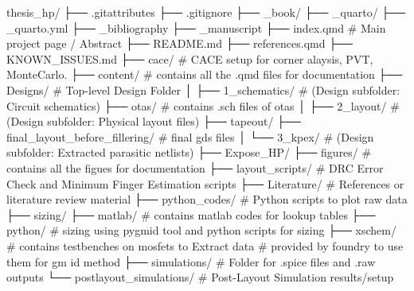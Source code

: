 \documentclass[
  11pt,
  a4paper,
  oneside]{scrbook}
\newenvironment{Shaded}{}{}
\newcommand{\NormalTok}[1]{#1}
\begin{document}
\begin{Shaded}
\begin{Highlighting}[]
\NormalTok{thesis\_hp/}
\NormalTok{├── .gitattributes}
\NormalTok{├── .gitignore}
\NormalTok{├── \_book/}
\NormalTok{├── \_quarto/}
\NormalTok{├── \_quarto.yml}
\NormalTok{├── \_bibliography}
\NormalTok{├── \_manuscript}
\NormalTok{├── index.qmd             \# Main project page / Abstract}
\NormalTok{├── README.md}
\NormalTok{├── references.qmd}
\NormalTok{├── KNOWN\_ISSUES.md}
\NormalTok{├── cace/                 \# CACE setup for corner alaysis, PVT, MonteCarlo.}
\NormalTok{├── content/              \# contains all the .qmd files for documentation}
\NormalTok{├── Designs/              \# Top{-}level Design Folder}
\NormalTok{│   ├── 1\_schematics/     \# (Design subfolder: Circuit schematics)}
\NormalTok{        ├── otas/          \# contains .sch files of otas}
\NormalTok{│   ├── 2\_layout/         \# (Design subfolder: Physical layout files)}
\NormalTok{        ├── tapeout/}
\NormalTok{            ├── final\_layout\_before\_fillering/   \# final gds files}
\NormalTok{│   └── 3\_kpex/           \# (Design subfolder: Extracted parasitic netlists)}
\NormalTok{├── Expose\_HP/            }
\NormalTok{├── figures/              \# contains all the figues for documentation}
\NormalTok{├── layout\_scripts/       \# DRC Error Check and Minimum Finger Estimation scripts}
\NormalTok{├── Literature/           \# References or literature review material}
\NormalTok{├── python\_codes/         \# Python scripts to plot raw data}
\NormalTok{├── sizing/}
\NormalTok{    ├── matlab/            \# contains matlab codes for lookup tables }
\NormalTok{    ├── python/            \# sizing using pygmid tool and python scripts for sizing}
\NormalTok{    ├── xschem/            \# contains testbenches on mosfets to Extract data  }
\NormalTok{                          \# provided by foundry to use them for gm id method}
\NormalTok{├── simulations/          \# Folder for .spice files and .raw outputs}
\NormalTok{└── postlayout\_simulations/   \# Post{-}Layout Simulation results/setup}
\end{Highlighting}
\end{Shaded}



\backmatter
\end{document}
